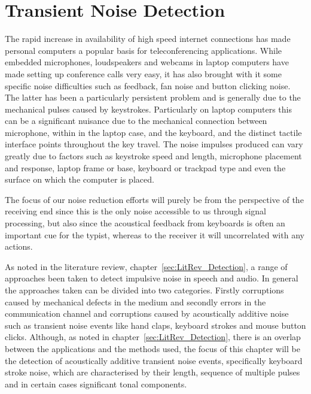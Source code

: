 \chapter{Transient Noise Detection}\label{ch:TransientNoiseDetection}

\ifpdf
    \graphicspath{{Chapter5_TransNoiseDet/Chapter5Figs/PNG/}{Chapter5_TransNoiseDet/Chapter5Figs/PDF/}{Chapter5_TransNoiseDet/Chapter5Figs/}{Chapter5_TransNoiseDet/Chapter5Figs/NoiseBurstModel/}{Chapter5_TransNoiseDet/Chapter5Figs/ARFilterMethod/}}
\else
    \graphicspath{{Chapter5_TransNoiseDet/Chapter5Figs/EPS/}{Chapter5_TransNoiseDet/Chapter5Figs/}}
\fi

The rapid increase in availability of high speed internet connections has made personal computers a popular basis for teleconferencing applications. While embedded microphones, loudspeakers and webcams in laptop computers have made setting up conference calls very easy, it has also brought with it some specific noise difficulties such as feedback, fan noise and button clicking noise. The latter has been a particularly persistent problem and is generally due to the mechanical pulses caused by keystrokes. Particularly on laptop computers this can be a significant nuisance due to the mechanical connection between microphone, within in the laptop case, and the keyboard, and the distinct tactile interface points throughout the key travel. The noise impulses produced can vary greatly due to factors such as keystroke speed and length, microphone placement and response, laptop frame or base, keyboard or trackpad type and even the surface on which the computer is placed.

The focus of our noise reduction efforts will purely be from the perspective of the receiving end since this is the only noise accessible to us through signal processing, but also since the acoustical feedback from keyboards is often an important cue for the typist, whereas to the receiver it will \DIFaddbegin {}\DIFaddend uncorrelated with any actions.

As noted in the literature review, chapter~\ref{sec:LitRev_Detection}, a range of approaches \DIFdelbegin {}\DIFdelend \DIFaddbegin {}\DIFaddend been taken to detect impulsive noise in speech and audio. In general the approaches taken can be divided into two categories. Firstly corruptions caused by mechanical defects in the medium \DIFdelbegin {}\DIFdelend \DIFaddbegin {}\DIFaddend and secondly errors in the communication channel and corruptions caused by acoustically additive noise such as transient noise events like hand claps, keyboard strokes and mouse button clicks. Although, as noted in chapter~\ref{sec:LitRev_Detection}, there is an overlap between the applications and the methods used, the focus of this chapter will be the detection of acoustically additive transient noise events, specifically keyboard stroke noise, which are characterised by their length, sequence of multiple pulses and in certain cases significant tonal components.

